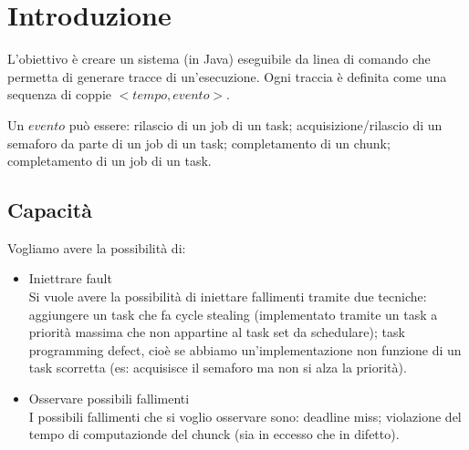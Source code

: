 \chapter{Introduzione}
L'obiettivo è creare un sistema (in Java) eseguibile da linea di comando che permetta di generare tracce di un'esecuzione. Ogni traccia è definita come una sequenza di coppie $<tempo, evento>$.

Un $evento$ può essere: rilascio di un job di un task; acquisizione/rilascio di un semaforo da parte di un job di un task; completamento di un chunk; completamento di un job di un task.

\section{Capacità}
Vogliamo avere la possibilità di:
\begin{itemize}
    \item Iniettrare fault \\
        Si vuole avere la possibilità di iniettare fallimenti tramite due tecniche: aggiungere un task che fa cycle stealing (implementato tramite un task a priorità massima che non appartine al task set da schedulare); task programming defect, cioè se abbiamo un'implementazione non funzione di un task scorretta (es: acquisisce il semaforo ma non si alza la priorità).
    \item Osservare possibili fallimenti \\
        I possibili fallimenti che si voglio osservare sono: deadline miss; violazione del tempo di computazionde del chunck (sia in eccesso che in difetto).
\end{itemize}
